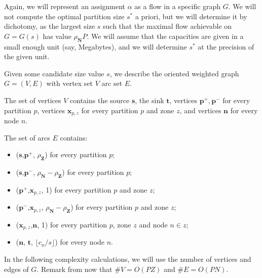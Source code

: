 \documentclass[]{article}
\begin{document}
Again, we will represent an assignment $\alpha$ as a flow in a specific graph $G$. We will not compute the optimal partition size $s^*$ a priori, but we will determine it by dichotomy, as the largest size $s$ such that the maximal flow achievable on $G=G(s)$ has value $\rho_\mathbf{N}P$. We will assume that the capacities are given in a small enough unit (say, Megabytes), and we will determine $s^*$ at the precision of the given unit.

Given some candidate size value $s$, we describe the oriented weighted graph $G=(V,E)$ with vertex set $V$ arc set $E$.

The set of vertices $V$ contains the source $\mathbf{s}$, the sink $\mathbf{t}$, vertices 
$\mathbf{p^+, p^-}$ for every partition $p$, vertices $\mathbf{x}_{p,z}$ for every partition $p$ and zone $z$, and vertices $\mathbf{n}$ for every node $n$. 

The set of arcs $E$ contains:
\begin{itemize}
	\item ($\mathbf{s}$,$\mathbf{p}^+$, $\rho_\mathbf{Z}$) for every partition $p$;
	\item ($\mathbf{s}$,$\mathbf{p}^-$, $\rho_\mathbf{N}-\rho_\mathbf{Z}$) for every partition $p$;
	\item ($\mathbf{p}^+$,$\mathbf{x}_{p,z}$, 1) for every partition $p$ and zone $z$;
	\item ($\mathbf{p}^-$,$\mathbf{x}_{p,z}$, $\rho_\mathbf{N}-\rho_\mathbf{Z}$) for every partition $p$ and zone $z$;
	\item ($\mathbf{x}_{p,z}$,$\mathbf{n}$, 1) for every partition $p$, zone $z$ and node $n\in z$;
	\item ($\mathbf{n}$, $\mathbf{t}$, $\lfloor c_n/s \rfloor$) for every node $n$.
\end{itemize}

In the following complexity calculations, we will use the number of vertices and edges of $G$. Remark from now that $\# V = O(PZ)$ and $\# E = O(PN)$.
\end{document}
